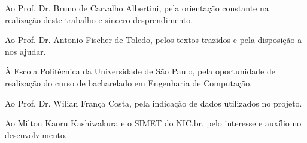 \documentclass[]{politex}
\newcommand*\NewPage{\newpage\null\thispagestyle{empty}\newpage}
\begin{document}
\capa
\NewPage
\falsafolhaderosto
\NewPage
\folhaderosto









\begin{agradecimentos}

Ao Prof. Dr. Bruno de Carvalho Albertini, pela orientação constante na
realização deste trabalho e sincero desprendimento.

Ao Prof. Dr. Antonio Fischer de Toledo, pelos textos trazidos e pela disposição
a nos ajudar.

À Escola Politécnica da Universidade de São Paulo, pela oportunidade de
realização do curso de bacharelado em Engenharia de Computação.

Ao Prof. Dr. Wilian França Costa, pela indicação de dados utilizados no projeto.

Ao Milton Kaoru Kashiwakura e o SIMET do NIC.br, pelo interesse e auxílio no
desenvolvimento.

\end{agradecimentos}


\end{document}
